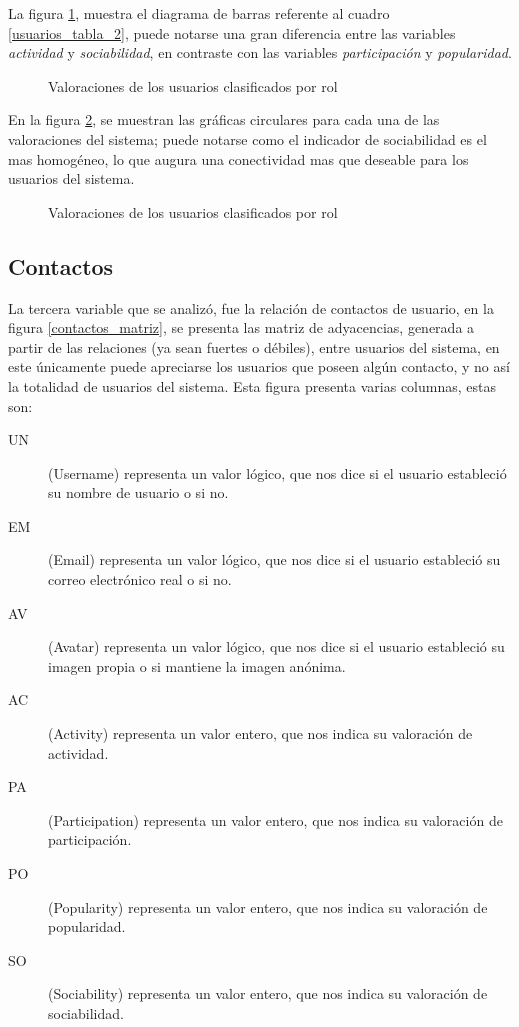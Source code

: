 La figura \ref{usuarios_bars_2}, muestra el diagrama de barras referente al
cuadro \ref{usuarios_tabla_2}, puede notarse una gran diferencia entre las
variables \emph{actividad} y \emph{sociabilidad}, en contraste con las variables
\emph{participación} y \emph{popularidad}.

\begin{figure}
\centering

\caption{Valoraciones de los usuarios clasificados por rol}
\label{usuarios_bars_2}
\end{figure}

En la figura \ref{usuarios_pie_2}, se muestran las gráficas circulares para cada
una de las valoraciones del sistema; puede notarse como el indicador de
sociabilidad es el mas homogéneo, lo que augura una conectividad mas que
deseable para los usuarios del sistema.

\begin{figure}
\centering

\caption{Valoraciones de los usuarios clasificados por rol}
\label{usuarios_pie_2}
\end{figure}

\subsection{Contactos}
La tercera variable que se analizó, fue la relación de contactos de usuario,
en la figura \ref{contactos_matriz}, se presenta las matriz de adyacencias,
generada a partir de las relaciones (ya sean fuertes o débiles), entre usuarios
del sistema, en este únicamente puede apreciarse los usuarios que poseen algún
contacto, y no así la totalidad de usuarios del sistema. Esta figura presenta
varias columnas, estas son:

\begin{description}
\item [UN] (Username) representa un valor lógico, que nos dice si el usuario
estableció su nombre de usuario o si no.
\item [EM] (Email) representa un valor lógico, que nos dice si el usuario
estableció su correo electrónico real o si no.
\item [AV] (Avatar) representa un valor lógico, que nos dice si el usuario
estableció su imagen propia o si mantiene la imagen anónima.
\item [AC] (Activity) representa un valor entero, que nos indica su valoración
de actividad.
\item [PA] (Participation) representa un valor entero, que nos indica su
valoración de participación.
\item [PO] (Popularity) representa un valor entero, que nos indica su
valoración de popularidad.
\item [SO] (Sociability) representa un valor entero, que nos indica su
valoración de sociabilidad.
\end{description}

